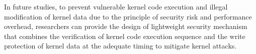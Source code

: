 %
In future studies, to prevent vulnerable kernel code execution and illegal
modification of kernel data due to the principle of security risk and
performance overhead, researchers can provide the design of lightweight security
mechanism that combines the verification of kernel code execution sequence and
the write protection of kernel data at the adequate timing to mitigate kernel
attacks.
%


